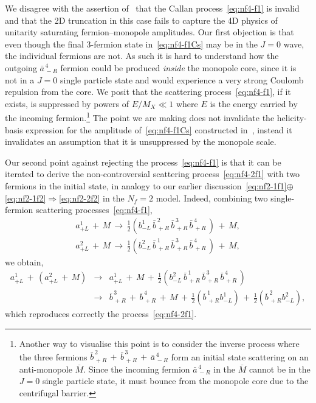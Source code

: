 \documentclass[a4paper,11pt]{article}
\begin{document}
We disagree with the assertion of~\cite{Csaki:2022qtz} that the Callan process~\eqref{eq:nf4-f1} is invalid and that the 2D truncation in this case fails to capture the 4D physics of unitarity saturating fermion--monopole amplitudes. Our first objection is that even though the final 3-fermion state in~\eqref{eq:nf4-f1Cs} may be in the $J=0$ wave, the individual fermions are not. As such it is hard to understand how the outgoing $\bar{a}_{\,-R}^{\,4}$ fermion could be produced {\it inside} the monopole core, since it is not in a $J=0$ single particle state and would experience a very strong Coulomb repulsion from the core. We posit that the scattering process~\eqref{eq:nf4-f1}, if it exists, is suppressed by powers of $E/M_X\ll 1$ where $E$ is the energy carried by the incoming fermion.\footnote{Another way to visualise this point is to consider the inverse 
process where the three fermions $\bar{b}_{\,+R}^{\,2} \,+\,\bar{b}_{\,+R}^{\,3} \,+\, \bar{a}_{\,-R}^{\,4} $ form an initial state scattering on an anti-monopole $\overline{M}$. Since the incoming fermion $\bar{a}_{\,-R}^{\,4} $  in the $\overline{M}$ cannot be in the $J=0$ single particle state, it must bounce from the monopole core due to the centrifugal barrier.}
The point we are making does not invalidate the helicity-basis expression for the amplitude of~\eqref{eq:nf4-f1Cs} constructed in~\cite{Csaki:2022qtz}, instead it invalidates an assumption that it is unsuppressed by the monopole scale.

Our second point against rejecting the process~\eqref{eq:nf4-f1} is that it can be iterated to derive the non-controversial scattering process~\eqref{eq:nf4-2f1}
with two fermions in the initial state, in analogy to our earlier discussion~\eqref{eq:nf2-1f1}$\oplus$\eqref{eq:nf2-1f2}$\Rightarrow$\eqref{eq:nf2-2f2}
in the $N_f=2$ model.
Indeed, combining two single-fermion scattering processes~\eqref{eq:nf4-f1},
\begin{eqnarray}
\label{eq:nf4-f11}
 a_{+L}^1 \,+\,  M \,\to\, \frac{1}{2} \left(b_{-L}^1\,
  \bar{b}_{\,+R}^{\,2} \,
  \bar{b}_{\,+R}^{\,3} \,
  \bar{b}_{\,+R}^{\,4} \,\right) \,+\,  M,\\
 \label{eq:nf4-f12}
 a_{+L}^2 \,+\,  M \,\to\, \frac{1}{2} \left(b_{-L}^2\,
  \bar{b}_{\,+R}^{\,1} \,
  \bar{b}_{\,+R}^{\,3} \,
  \bar{b}_{\,+R}^{\,4} \,\right) \,+\,  M,
\end{eqnarray} 
we obtain,
\begin{eqnarray}
 a_{+L}^1 \,+\, \left(a_{+L}^2 \,+\,  M\right) &\to&
 a_{+L}^1 \,+\,  M \,+\,
 \frac{1}{2} \left(b_{-L}^2\,
  \bar{b}_{\,+R}^{\,1} \,
  \bar{b}_{\,+R}^{\,3} \,
  \bar{b}_{\,+R}^{\,4} \,\right) 
  \nonumber\\
  \label{eq:nf4-f22}
 &\to& \bar{b}_{\,+R}^{\,3} \,+\, \bar{b}_{\,+R}^{\,4}
  \,+\,  M 
  \,+\, \frac{1}{2} \left(\bar{b}_{\,+R}^{\,1} b_{-L}^1\right)
   \,+\, \frac{1}{2} \left(\bar{b}_{\,+R}^{\,2} b_{-L}^2\right), 
\end{eqnarray}
which reproduces correctly the process~\eqref{eq:nf4-2f1}.
\end{document}
